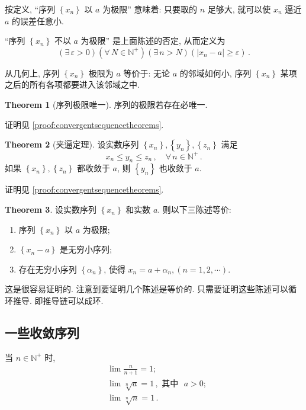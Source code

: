 \documentclass{book}
\newcommand{\Exists}{\exists\,}
\newcommand{\Any}{\forall\,}
\newcommand{\set}[1]{\left\{#1\right\}}
\newcommand{\abs}[1]{\left\lvert #1 \right\rvert}
\newcommand{\N}{\mathbb{N}}
\renewcommand{\ge}{\geqslant}
\renewcommand{\le}{\leqslant}
\numberwithin{equation}{section}
\numberwithin{figure}{section}
\theoremstyle{definition}
\newtheorem{theorem}{Theorem}[section]
\newcommand{\dq}[1]{``#1''}
\begin{document}
按定义, \dq{序列 $\set{x_n}$ 以 $a$ 为极限} 意味着: 只要取的 $n$ 足够大, 就可以使 $x_n$ 逼近 $a$ 的误差任意小.

\dq{序列 $\set{x_n}$ 不以 $a$ 为极限} 是上面陈述的否定, 从而定义为
\begin{equation*}
  (\Exists \varepsilon>0)(\Any N\in\N^+)(\Exists n>N)(\abs{x_n-a}\ge\varepsilon)\,.
\end{equation*}

从几何上, 序列 $\set{x_n}$ 极限为 $a$ 等价于: 无论 $a$ 的邻域如何小, 序列 $\set{x_n}$ 某项之后的所有各项都要进入该邻域之中.

\begin{theorem}[序列极限唯一]
  序列的极限若存在必唯一.
  \label{the:sequencelimitUnique}
\end{theorem}
证明见 \cref{proof:convergentsequencetheorems}.

\begin{theorem}[夹逼定理]
  设实数序列 $\set{x_n},\set{y_n},\set{z_n}$ 满足
  \begin{equation*}
    x_n\le y_n\le z_n\,,\quad\Any n\in\N^+\,.
  \end{equation*}
  如果 $\set{x_n},\set{z_n}$ 都收敛于 $a$, 则 $\set{y_n}$ 也收敛于 $a$.
  \label{the:SqueezeTheorem}
\end{theorem}
证明见 \cref{proof:convergentsequencetheorems}.

\begin{theorem}
  设实数序列 $\set{x_n}$ 和实数 $a$. 则以下三陈述等价:
  \begin{enumerate}
    \item 序列 $\set{x_n}$ 以 $a$ 为极限;
    \item $\set{x_n-a}$ 是无穷小序列;
    \item 存在无穷小序列 $\set{\alpha_n}$, 使得 $x_n=a+\alpha_n,(n=1,2,\cdots)$.
  \end{enumerate}
  \label{the:convergentsequenceandinfinitesimalsequenceTRANSFORM}
\end{theorem}
  这是很容易证明的. 注意到要证明几个陈述是等价的. 只需要证明这些陈述可以循环推导. 即推导链可以成环.

\subsection{一些收敛序列}
当 $n\in\N^+$ 时,
\begin{align}
  &\lim\frac{n}{n+1}=1\label{eqn:nn11};\\
  &\lim\sqrt[n]{a}=1\,,\text{ 其中{} }a>0;\label{eqn:na1}\\
  &\lim\sqrt[n]{n}=1\,.\label{eqn:nn1}
\end{align}
\end{document}
